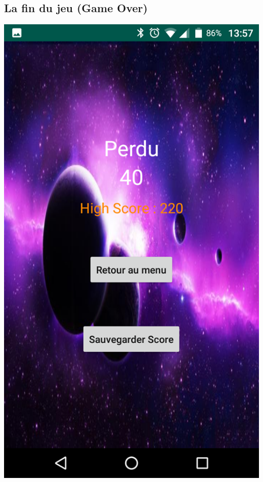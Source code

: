 \documentclass{article}
\begin{document}
\subsection{La fin du jeu (Game Over)}
\begin{minipage}[c]{.46\linewidth}
     \begin{center}
             \includegraphics[scale=0.2]{GameOver.png}
         \end{center}
   \end{minipage} \hfill
\end{document}
